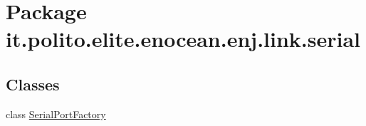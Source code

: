 \hypertarget{namespaceit_1_1polito_1_1elite_1_1enocean_1_1enj_1_1link_1_1serial}{}\section{Package it.\+polito.\+elite.\+enocean.\+enj.\+link.\+serial}
\label{namespaceit_1_1polito_1_1elite_1_1enocean_1_1enj_1_1link_1_1serial}
\subsection*{Classes}
\begin{DoxyCompactItemize}
\item 
class \hyperlink{classit_1_1polito_1_1elite_1_1enocean_1_1enj_1_1link_1_1serial_1_1_serial_port_factory}{Serial\+Port\+Factory}
\end{DoxyCompactItemize}
